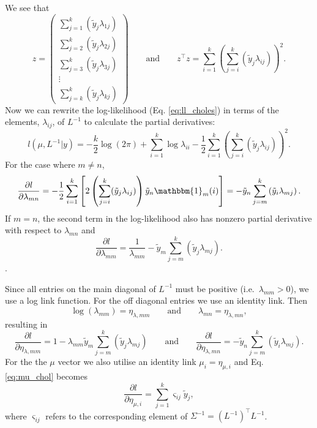 \documentclass{article}
\begin{document}
%
We see that 
%
\begin{equation}
	z =
  \begin{pmatrix}
    \sum_{j=1}^k (\tilde{y}_j \lambda_{1j}) \\
    \sum_{j=2}^k (\tilde{y}_j \lambda_{2j}) \\
    \sum_{j=3}^k (\tilde{y}_j \lambda_{3j}) \\
    \vdots \\
    \sum_{j=k}^k (\tilde{y}_j \lambda_{kj}) 
  \end{pmatrix}
  \qquad \text{and} \qquad
  z^\top z =
	\sum_{i=1}^k \left( \sum_{j=i}^k \left( \tilde{y}_j \lambda_{ij} \right) \right)^2.
\end{equation}
%
Now we can rewrite the log-likelihood (Eq. \ref{eq:ll_choles}) in terms of the 
elements, $\lambda_{ij}$, of $L^{-1}$ to calculate the partial derivatives:
%
\begin{equation}
	l(\mu, L^{-1}|y) = -\frac{k}{2}\log(2\pi) + \sum_{i=1}^k 
	\log{\lambda_{ii}} - \frac{1}{2} \sum_{i=1}^k 
	\left( \sum_{j=i}^k \left( \tilde{y}_j \lambda_{ij} 
	\right) \right)^2.
 \label{eq:ll_chol_terms}
\end{equation}
%
For the case where $m \neq n$, 
%
\begin{equation}
  \frac{\partial l}{\partial \lambda_{mn}} = 
  -\frac{1}{2} \sum_{i=1}^k \left[2 \left(\sum_{j=i}^k (\tilde{y}_j \lambda_{ij}) 
	\right) \tilde{y}_n \mathbbm{1}_m(i) \right] = 
  - \tilde{y}_n \sum_{j = m}^{k} \left( \tilde{y}_i \lambda_{mj} \right).	
\end{equation}
%
If $m = n$, the second term in the log-likelihood also has nonzero partial 
derivative with respect to $\lambda_{mn}$ and
%
\begin{equation}
  \frac{\partial l}{\partial \lambda_{mm}} = 
	\frac{1}{\lambda_{mm}}- \tilde{y}_m \sum_{j = m}^{k} 
	\left( \tilde{y}_j \lambda_{mj} \right).	
\end{equation}.

Since all entries on the main diagonal of $L^{-1}$ must be positive 
(i.e.\ $\lambda_{mm} > 0$), we use a log link function. For the 
off diagonal entries we use an identity link. Then
%
\begin{equation}
	\log(\lambda_{mm}) = \eta_{\lambda,mm} \qquad \text{and} \qquad  
        \lambda_{mn} = \eta_{\lambda,mn},
\end{equation}
%
resulting in 
%
\begin{equation}
  \frac{\partial l}{\partial \eta_{\lambda,mm}} = 
	1 - \lambda_{mm} \tilde{y}_m \sum_{j=m}^k (\tilde{y}_j \lambda_{mj})
  \qquad \text{and} \qquad
  \frac{\partial l}{\partial \eta_{\lambda,mn}} = 
	- \tilde{y}_n \sum_{j = m}^{k} \left( \tilde{y}_i \lambda_{mj} \right).
\end{equation}
%
For the the $\mu$ vector we also utilise an identity link 
$\mu_i = \eta_{\mu,i}$ and Eq. \ref{eq:mu_chol} becomes
%
\begin{equation}
  \frac{\partial l}{\partial \eta_{\mu, i}} = 
	\sum_{j=1}^k \varsigma_{ij} \tilde{y}_j, 
\end{equation}
%
where $\varsigma_{ij}$ refers to the corresponding element of 
$\Sigma^{-1} = (L^{-1})^\top L^{-1}$.
\end{document}
